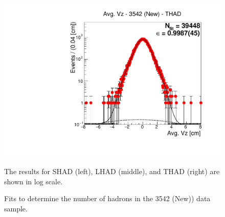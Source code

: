 \begin{figure}[H]
\includegraphics[scale=0.25]{figures/plots/nonDDbar_fit_results/3650_new/fit_new_3542_data_THAD.pdf}
\caption{Fits to determine the number of hadrons in the 3542 (New)) data sample.}
{The results for SHAD (left), LHAD (middle), and THAD (right) are shown in log scale.}
\label{fig:hadron_fits_3542_new}
\end{figure}


